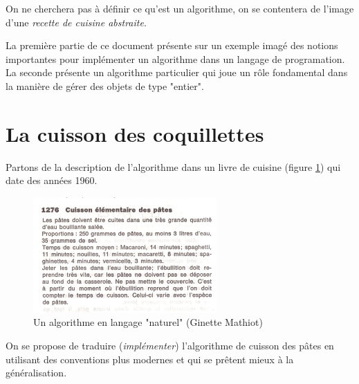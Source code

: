 



On ne cherchera pas à définir ce qu'est un algorithme, on se contentera de l'image d'une \emph{recette de cuisine abstraite}.

La première partie de ce document présente sur un exemple imagé des notions importantes pour implémenter un algorithme dans un langage de programation. La seconde présente un algorithme particulier qui joue un rôle fondamental dans la manière de gérer des objets de type "entier".

\section{La cuisson des coquillettes}
Partons de la description de l'algorithme dans un livre de cuisine (figure \ref{fig:introalgo_1}) qui date des années 1960. 
\begin{figure}[ht]
 \centering
 \includegraphics[width=7cm]{introalgo_1.png}
 \caption{Un algorithme en langage "naturel" (Ginette Mathiot)}
 \label{fig:introalgo_1}
\end{figure}
On se propose de traduire (\emph{implémenter}) l'algorithme de cuisson des pâtes en utilisant des conventions plus modernes et qui se prêtent mieux à la généralisation.

